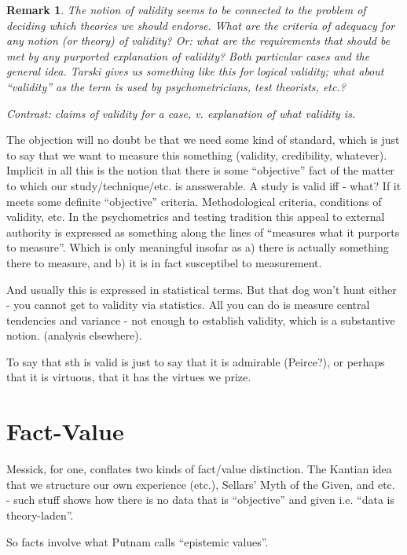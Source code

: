 \documentclass[11pt,twoside]{article}
\newtheorem{remark}{Remark}
\begin{document}
\begin{remark}
  The notion of validity seems to be connected to the problem of
  deciding which theories we should endorse.  What are the criteria of
  adequacy for any notion (or theory) of validity?  Or: what are the
  requirements that should be met by any purported explanation of
  validity?  Both particular cases and the general idea.  Tarski gives
  us something like this for logical validity; what about ``validity''
  as the term is used by psychometricians, test theorists, etc.?

Contrast: claims of validity for a case, v. explanation of what
validity is.


\end{remark}

The objection will no doubt be that we need some kind of standard,
which is just to say that we want to measure this something (validity,
credibility, whatever).  Implicit in all this is the notion that there
is some ``objective'' fact of the matter to which our
study/technique/etc. is ansswerable. A study is valid iff - what?  If
it meets some definite ``objective'' criteria.  Methodological
criteria, conditions of validity, etc.  In the psychometrics and
testing tradition this appeal to external authority is expressed as
something along the lines of ``measures what it purports to measure''.
Which is only meaningful insofar as a) there is actually something
there to measure, and b) it is in fact susceptibel to measurement.

And usually this is expressed in statistical terms.  But that dog
won't hunt either - you cannot get to validity via statistics.  All
you can do is measure central tendencies and variance - not enough to
establish validity, which is a substantive notion. (analysis
elsewhere).

To say that sth is valid is just to say that it is admirable
(Peirce?), or perhaps that it is virtuous, that it has the virtues we
prize.

\section{Fact-Value}

Messick, for one, conflates two kinds of fact/value distinction.  The
Kantian idea that we structure our own experience (etc.), Sellars'
Myth of the Given, and etc. - such stuff shows how there is no data
that is ``objective'' and given i.e. ``data is theory-laden''.

So facts involve what Putnam calls ``epistemic values''.
\end{document}
